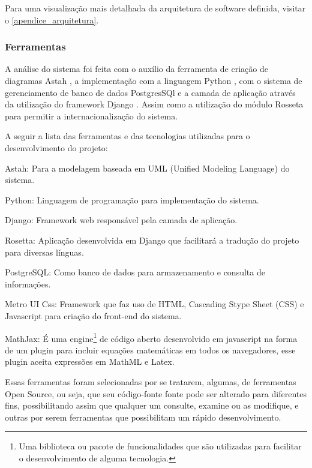 Para uma visualização mais detalhada da arquitetura de software definida, visitar o  \autoref{apendice_arquitetura}.

\subsubsection{Ferramentas}

 A análise do sistema foi feita com o auxílio da ferramenta de criação de diagramas Astah \cite{astah2016}, a implementação com a linguagem Python \cite{vanrossum2010python}, com o sistema de gerenciamento de banco de dados PostgresSQl \cite{momjian2001postgresql} e a camada de aplicação através da utilização do framework Django \cite{django2016}. Assim como a utilização do módulo Rosseta \cite{rosetta2016} para permitir a internacionalização do sistema.
 
A seguir a lista das ferramentas e das tecnologias utilizadas para o desenvolvimento do projeto:

\begin{alineas}
	\item Astah: Para a modelagem baseada em UML (Unified Modeling Language) do sistema.
	\item Python: Linguagem de programação para implementação do sistema.
    \item Django: Framework web responsável pela camada de aplicação.
    \item Rosetta: Aplicação desenvolvida em Django que facilitará a tradução do projeto para diversas línguas.  
    \item PostgreSQL: Como banco de dados para armazenamento e consulta de informações.
    \item Metro UI Css: Framework que faz uso de HTML, Cascading Stype Sheet (CSS) e Javascript para criação do front-end do sistema.
    \item MathJax: É uma engine\footnote{Uma biblioteca ou pacote de funcionalidades que são utilizadas para facilitar o desenvolvimento de alguma tecnologia.} de código aberto desenvolvido em javascript na forma de um plugin para incluir equações matemáticas em todos os navegadores, esse plugin aceita expressões em  MathML e Latex.

\end{alineas}

Essas ferramentas foram selecionadas por se tratarem, algumas, de ferramentas Open Source, ou seja, que seu código-fonte fonte pode ser alterado para diferentes fins, possibilitando assim que qualquer um consulte, examine ou as modifique, e outras por serem ferramentas que possibilitam um rápido desenvolvimento.

